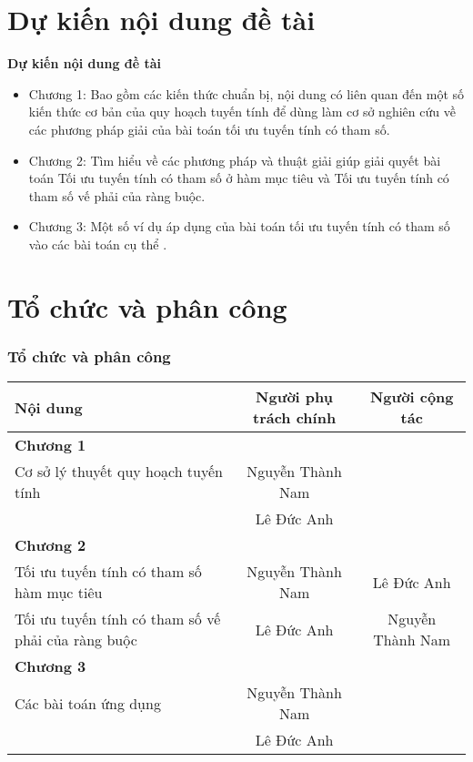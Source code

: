 \documentclass{beamer}
\begin{document}
\section{Dự kiến nội dung đề tài}
\begin{frame}{\bf Dự kiến nội dung đề tài}
    \begin{itemize}
    \item Chương 1:  Bao gồm các kiến thức chuẩn bị, nội dung có liên quan đến
    một số kiến thức cơ bản của quy hoạch tuyến tính để dùng
    làm cơ sở nghiên cứu về các phương pháp giải của bài toán tối ưu tuyến tính có tham số.
    \item Chương 2: Tìm hiểu về các phương pháp và thuật giải giúp giải quyết bài toán Tối ưu tuyến tính có tham số ở hàm mục tiêu và Tối ưu tuyến tính có tham số vế phải của ràng buộc.
    \item Chương 3: Một số ví dụ áp dụng của bài toán tối ưu tuyến tính có tham số vào các bài toán cụ thể .
    \end{itemize}   
\end{frame}
\section{Tổ chức và phân công}
\begin{frame}[shrink=20]
    \frametitle{\bf Tổ chức và phân công}
    \vspace{1.5cm}
    \begin{table}
        \begin{tabular}{|p{2.5in}|c|c|}
            \hline
            \textbf{Nội dung} & Người phụ trách chính & Người cộng tác \\
            \hline \hline
            \textbf{Chương 1} && \\
            \hline
            Cơ sở lý thuyết quy hoạch tuyến tính & Nguyễn Thành Nam & \\
            & Lê Đức Anh & \\
            \hline
            \textbf{Chương 2} && \\
            \hline
           Tối ưu tuyến tính có tham số hàm mục tiêu & Nguyễn Thành Nam & Lê Đức Anh \\
           \hline
           Tối ưu tuyến tính có tham số vế phải của ràng buộc & Lê Đức Anh & Nguyễn Thành Nam\\
            \hline
            \textbf{Chương 3} && \\
            \hline
            Các bài toán ứng dụng & Nguyễn Thành Nam & \\
            & Lê Đức Anh & \\
            \hline
        \end{tabular}
    \end{table}
\end{frame}
\end{document}

